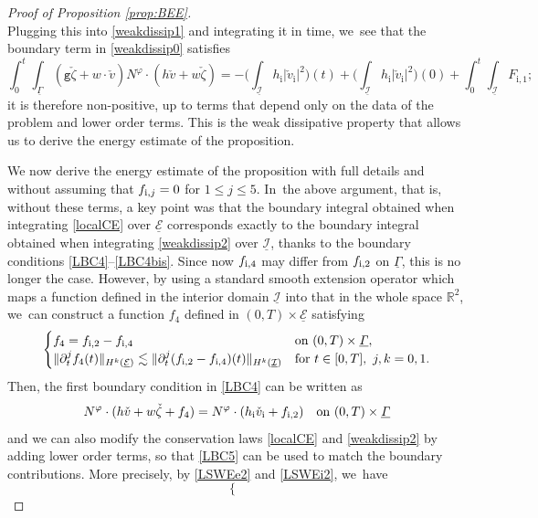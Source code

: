 \documentclass[10pt]{amsart}
\newcommand{\abs}[1]{\vert#1\vert}
\newcommand{\gr}{{\mathtt g}}
\newcommand{\R}{{\mathbb R}}
\newcommand{\dt}{\partial_t}
\newcommand{\cI}{{\mathcal I}}
\newcommand{\cE}{{\mathcal E}}
\newcommand{\ul}[1]{\underline{#1}}
\newcommand{\itGamma}{\mathit{\Gamma}}
\theoremstyle{definition}
\begin{document}
\begin{proof}[Proof of Proposition \ref{prop:BEE}]
\[\]
Plugging this into \eqref{weakdissip1} and integrating it in time, we~see that the boundary term in \eqref{weakdissip0} satisfies
\[
\int_0^t \int_{\ul\itGamma} (\gr\check{\zeta}+w\cdot\check{v}) N^\varphi\cdot (h\check{v}+w\check{\zeta})
= - \bigl(\int_{\ul{\cI}} h_\mathrm{i}\abs{\check{v}_\mathrm{i}}^2\bigr)(t)
+ \bigl(\int_{\ul{\cI}} h_\mathrm{i}\abs{\check{v}_\mathrm{i}}^2\bigr)(0)+\int_0^t \int_{\ul{\cI}}F_\mathrm{i,1};
\]
it is therefore non-positive, up to terms that depend only on the data of the problem and lower order terms.
This is the weak dissipative property that allows us to derive the energy estimate of the proposition.

We now derive the energy estimate of the proposition with full details and without assuming that $f_{{\rm i},j}=0$ for $1\leq j\leq 5$. In~the above argument, that is, without these terms, a key point was that the boundary integral obtained when integrating \eqref{localCE} over $\ul{\cE}$
corresponds exactly to the boundary integral obtained when integrating \eqref{weakdissip2} over $\ul{\cI}$,
thanks to the boundary conditions \eqref{LBC4}--\eqref{LBC4bis}.
Since now $f_{{\rm i},4}$ may differ from $f_{{\rm i},2}$ on $\ul{\itGamma}$, this is no longer the case.
However, by using a standard smooth extension operator which maps a function defined in the interior domain $\ul{\cI}$ into that in the whole space $\R^2$, we~can construct a function $f_4$ defined in $(0,T)\times\ul{\cE}$ satisfying
\begin{equation}\label{Ext1}
\begin{cases}
f_4 = f_{{\rm i},2}-f_{{\rm i},4} &\text{on } (0,T)\times\ul{\itGamma}, \\
\|\dt^jf_4(t)\|_{H^k(\ul{\cE})} \lesssim \|\dt^j(f_{{\rm i},2}-f_{{\rm i},4})(t)\|_{H^k(\ul{\cI})} &\text{for } t\in[0,T], \ j,k=0,1.
\end{cases}
\end{equation}
Then, the first boundary condition in \eqref{LBC4} can be written as
\begin{equation}\label{LBC5}
N^\varphi\cdot(h\check{v}+w\check{\zeta}+f_4) = N^\varphi\cdot(h_\mathrm{i}\check{v}_\mathrm{i}+f_{{\rm i},2}) \quad\text{on } (0,T)\times\ul{\itGamma}
\end{equation}
and we can also modify the conservation laws \eqref{localCE} and \eqref{weakdissip2} by adding lower order terms,
so that \eqref{LBC5} can be used to match the boundary contributions.
More precisely, by \eqref{LSWEe2} and \eqref{LSWEi2}, we~have
\[
\begin{cases}

\end{cases}\]
\end{proof}
\end{document}
